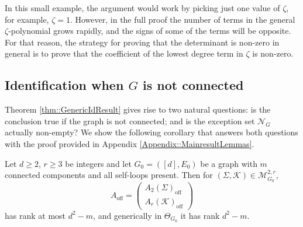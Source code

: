 \documentclass{biometrika}
\begin{document}
\begin{example}
In this small 
example, the argument would work by picking just one value of $\zeta$, for example, $\zeta = 1$. However, in the full proof the number of terms in the general $\zeta$-polynomial grows rapidly, and the signs of some of the terms will be opposite. For that reason, the strategy for proving that the determinant is non-zero in general is to prove that the coefficient of the lowest degree term in $\zeta$ is non-zero.  


\end{example}




\subsection{Identification when $G$ is not connected}
\label{sec:nonid}

Theorem \ref{thm::GenericIdResult} gives rise to two natural questions: is the conclusion true if 
the graph is not connected; and is the exception set $\mathcal{N}_G$ actually non-empty? We show 
the following corollary that answers both questions with the proof provided in Appendix \ref{Appendix::MainresultLemmas}. 

\begin{corollary}
    \label{cor::RankConnectedComponents}
    Let $d \geq 2$, $r \geq 3$ be integers and let $G_0 = ([d], E_0)$ be a graph with $m$ connected components and all self-loops present. Then for $(\Sigma, \mathcal{K} ) \in \mathcal{M}^{2,r}_{G_0}$,
    \begin{equation}
        A_{\mathrm{off}} = \begin{pmatrix}
            A_2(\Sigma)_{\mathrm{off}}\\ 
            A_r(\mathcal{K} )_{\mathrm{off}} 
        \end{pmatrix}
    \end{equation}
   has rank at most $d^2 - m$, and generically in $\Theta_{G_0}$ it has rank $d^2 - m$.
\end{corollary}


\end{document}
